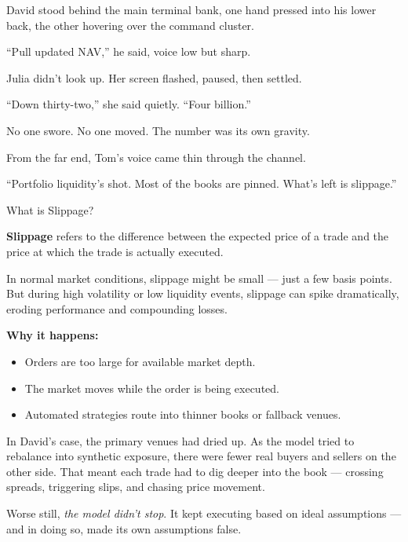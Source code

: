 David stood behind the main terminal bank, one hand pressed into his lower back, the other hovering 
over the command cluster.

“Pull updated NAV,” he said, voice low but sharp.

Julia didn’t look up. Her screen flashed, paused, then settled.

“Down thirty-two,” she said quietly. “Four billion.”

No one swore. No one moved. The number was its own gravity.

From the far end, Tom’s voice came thin through the channel.

“Portfolio liquidity’s shot. Most of the books are pinned. What’s left is slippage.”

\begin{TechnicalSidebar}{What is Slippage?}

  \textbf{Slippage} refers to the difference between the expected price of a trade and the price at which the trade 
  is actually executed.

  \medskip

  In normal market conditions, slippage might be small — just a few basis points.  
  But during high volatility or low liquidity events, slippage can spike dramatically, eroding performance and 
  compounding losses.

  \medskip

  \textbf{Why it happens:}
  \begin{itemize}
    \item Orders are too large for available market depth.
    \item The market moves while the order is being executed.
    \item Automated strategies route into thinner books or fallback venues.
  \end{itemize}

  \medskip

  In David’s case, the primary venues had dried up.  
  As the model tried to rebalance into synthetic exposure, there were fewer real buyers and sellers on the other side.  
  That meant each trade had to dig deeper into the book — crossing spreads, triggering slips, and chasing price movement.

  \medskip

  Worse still, \textit{the model didn’t stop}.  
  It kept executing based on ideal assumptions — and in doing so, made its own assumptions false.

\end{TechnicalSidebar}


